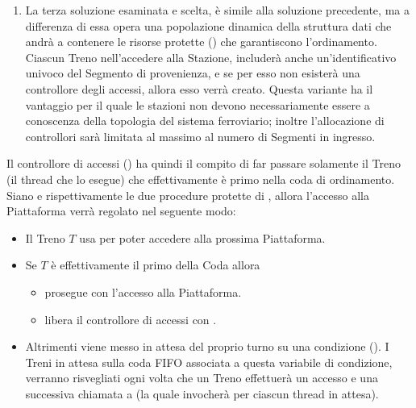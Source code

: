 \begin{description}
\begin{enumerate}
			\item La terza soluzione esaminata e scelta, è simile alla soluzione precedente, ma a differenza di essa opera una popolazione dinamica della struttura dati che andrà a contenere le risorse protette () che garantiscono l'ordinamento. Ciascun Treno nell'accedere alla Stazione, includerà anche un'identificativo univoco del Segmento di provenienza, e se per esso non esisterà una controllore degli accessi, allora esso verrà creato. Questa variante ha il vantaggio per il quale le stazioni non devono necessariamente essere a conoscenza della topologia del sistema ferroviario; inoltre l'allocazione di controllori sarà limitata al massimo al numero di Segmenti in ingresso.
		\end{enumerate} 
		
		Il controllore di accessi () ha quindi il compito di far passare solamente il Treno (il thread che lo esegue) che effettivamente è primo nella coda di ordinamento.
		Siano  e  rispettivamente le due procedure protette di , allora l'accesso alla Piattaforma verrà regolato nel seguente modo:
			\begin{itemize}
				\item Il Treno $T$ usa  per poter accedere alla prossima Piattaforma.
				\item Se $T$ è effettivamente il primo della Coda allora 
					\begin{itemize}
						\item prosegue con l'accesso alla Piattaforma. 
						\item libera il controllore di accessi  con . 
					\end {itemize}
				\item Altrimenti viene messo in attesa del proprio turno su una condizione (). I Treni in attesa sulla coda FIFO associata a questa variabile di condizione, verranno risvegliati ogni volta che un Treno effettuerà un accesso e una successiva chiamata a  (la quale invocherà  per ciascun thread in attesa).
			\end{itemize}
		
		
		\item{}
		

\end{description}
